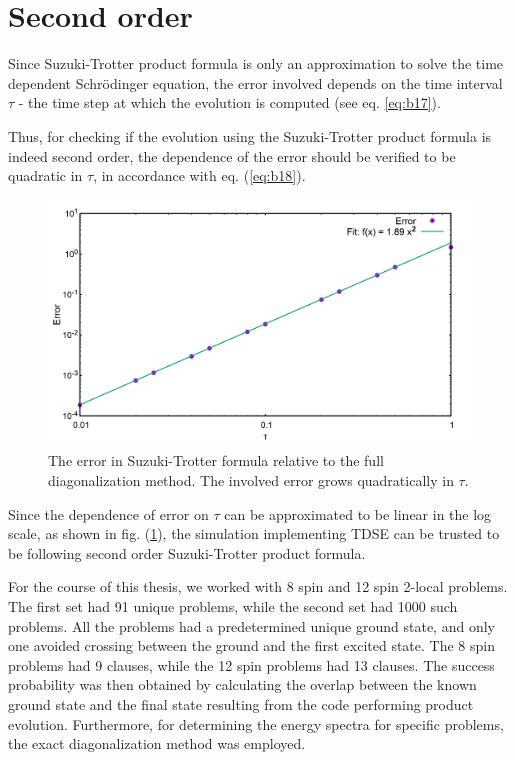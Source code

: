 \documentclass[../main.tex]{subfiles}
\begin{document}
\section{Second order}
Since Suzuki-Trotter product formula is only an approximation to solve the time dependent Schr{\"o}dinger equation, the error involved depends on the time interval $\tau$ - the time step at which the evolution is computed (see eq. \ref{eq:b17}). 

Thus, for checking if the evolution using the Suzuki-Trotter product formula is indeed second order, the dependence of the error should be verified to be quadratic in $\tau$, in accordance with eq. (\ref{eq:b18}). 
\begin{figure}[H]
\centering 
\includegraphics[scale=0.2]{Error.png}
\caption{The error in Suzuki-Trotter formula relative to the full diagonalization method. The involved error grows quadratically in $\tau$.}
\label{fig:o1}
\end{figure}
Since the dependence of error on $\tau$ can be approximated to be linear in the log scale, as shown in fig. (\ref{fig:o1}), the simulation implementing TDSE can be trusted to be following second order Suzuki-Trotter product formula.

For the course of this thesis, we worked with 8 spin and 12 spin 2-local problems. The first set had 91 unique problems, while the second set had 1000 such problems. All the problems had a predetermined unique ground state, and only one avoided crossing between the ground and the first excited state. The 8 spin problems had 9 clauses, while the 12 spin problems had 13 clauses. The success probability was then obtained by calculating the overlap between the known ground state and the final state resulting from the code performing product evolution. Furthermore, for determining the energy spectra for specific problems, the exact diagonalization method was employed.
\end{document}
